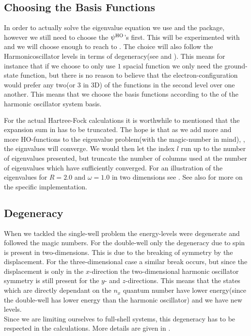 \subsection{Choosing the Basis Functions}
    In order to actually solve the eigenvalue equation we use  and
    the  package, however we still need to choose the $\psi^{\text{HO}}$'s
    first. This will be experimented with and we will choose enough to reach to
    . The choice will also follow the
    Harmonicoscillator levels in terms of degeneracy(see  and
    ). This means for instance that if we choose to only use $1$
    spacial function we only need the ground-state function, but there is no
    reason to believe that the electron-configuration would prefer any two(or
    $3$ in 3D) of the functions in the second level over one another. This
    means that we choose the basis functions according to the  of the harmonic oscillator system basis.

    For the actual Hartree-Fock calculations it is worthwhile to mentioned that
    the expansion sum in  has to be truncated. The hope
    is that as we add more and more HO-functions to the eigenvalue problem(with
    the magic-number in mind), , the eignvalues will converge.
    We would then let the index $l$ run up to the number of eigenvalues
    presented, but truncate the number of columns used at the number of
    eigenvalues which have sufficiently converged. For an illustration of the
    eigenvalues for $R=2.0$ and $\omega=1.0$ in two dimensions see
    . See also  for more on the specific
    implementation.

\subsection{Degeneracy}
    When we tackled the single-well problem the energy-levels were degenerate
    and followed the magic numbers. For the double-well only the degeneracy due
    to spin is present in two-dimensions. This is due to the breaking of
    symmetry by the displacement. For the three-dimensional case a similar
    break occurs, but since the displacement is only in the $x$-direction the
    two-dimensional harmonic oscillator symmetry is still present for the $y$-
    and $z$-directions. This means that the states which are directly dependant
    on the $n_x$ quantum number have lower energy(since the double-well has
    lower energy than the harmonic oscillator) and we have new levels. \\ Since
    we are limiting ourselves to full-shell systems, this degeneracy has to be
    respected in the calculations. More details are given in .
    

